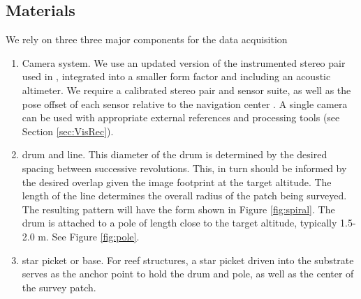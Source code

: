 
\subsection{Materials}
We rely on three three major components for the data acquisition
\begin{enumerate}
\item Camera system. We use an updated version of the instrumented stereo pair used in \cite{Henderson_2013} \cite{Camilli_2007}, integrated into a smaller form factor and including an acoustic altimeter. We require a calibrated stereo pair and sensor suite, as well as the pose offset of each sensor relative to the navigation center \cite{Johnson_Roberson_2013} \cite{Mahon_2008}. A single camera can be used with appropriate external references and processing tools (see Section \ref{sec:VisRec}).
\item drum and line. This diameter of the drum is determined by the desired spacing between successive revolutions. This, in turn should be informed by the desired overlap given the image footprint at the target altitude. The length of the line determines the overall radius of the patch being surveyed. The resulting pattern will have the form shown in Figure \ref{fig:spiral}. The drum is attached to a pole of length close to the target altitude, typically 1.5-2.0 m. See Figure \ref{fig:pole}.




\item star picket or base. For reef structures, a star picket driven into the substrate serves as the anchor point to hold the drum and pole, as well as the center of the survey patch.

\end{enumerate}


  